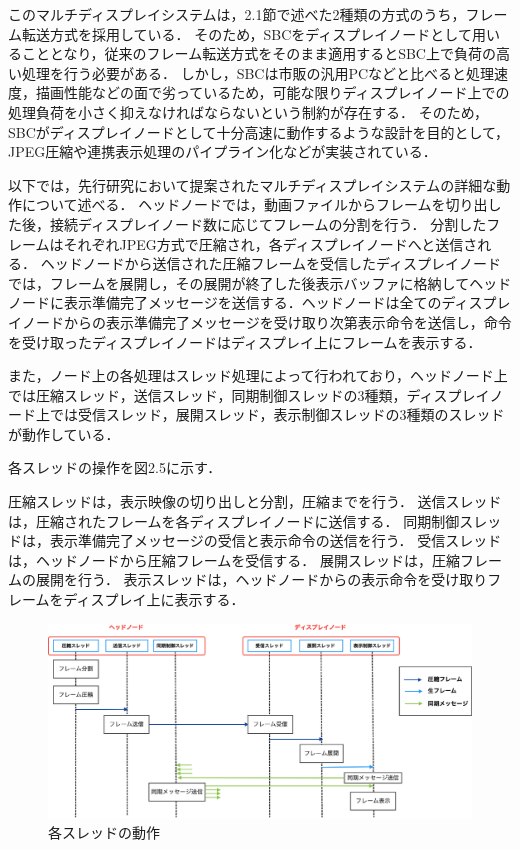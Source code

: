 このマルチディスプレイシステムは，2.1節で述べた2種類の方式のうち，フレーム転送方式を採用している．
そのため，SBCをディスプレイノードとして用いることとなり，従来のフレーム転送方式をそのまま適用するとSBC上で負荷の高い処理を行う必要がある．
しかし，SBCは市販の汎用PCなどと比べると処理速度，描画性能などの面で劣っているため，可能な限りディスプレイノード上での処理負荷を小さく抑えなければならないという制約が存在する．
そのため，SBCがディスプレイノードとして十分高速に動作するような設計を目的として，JPEG圧縮や連携表示処理のパイプライン化などが実装されている．

以下では，先行研究において提案されたマルチディスプレイシステムの詳細な動作について述べる．
ヘッドノードでは，動画ファイルからフレームを切り出した後，接続ディスプレイノード数に応じてフレームの分割を行う．
分割したフレームはそれぞれJPEG方式で圧縮され，各ディスプレイノードへと送信される．
ヘッドノードから送信された圧縮フレームを受信したディスプレイノードでは，フレームを展開し，その展開が終了した後表示バッファに格納してヘッドノードに表示準備完了メッセージを送信する．ヘッドノードは全てのディスプレイノードからの表示準備完了メッセージを受け取り次第表示命令を送信し，命令を受け取ったディスプレイノードはディスプレイ上にフレームを表示する．

また，ノード上の各処理はスレッド処理によって行われており，ヘッドノード上では圧縮スレッド，送信スレッド，同期制御スレッドの3種類，ディスプレイノード上では受信スレッド，展開スレッド，表示制御スレッドの3種類のスレッドが動作している．

各スレッドの操作を図2.5に示す．

圧縮スレッドは，表示映像の切り出しと分割，圧縮までを行う．
送信スレッドは，圧縮されたフレームを各ディスプレイノードに送信する．
同期制御スレッドは，表示準備完了メッセージの受信と表示命令の送信を行う．
受信スレッドは，ヘッドノードから圧縮フレームを受信する．
展開スレッドは，圧縮フレームの展開を行う．
表示スレッドは，ヘッドノードからの表示命令を受け取りフレームをディスプレイ上に表示する．

\begin{center}
  \begin{figure}[H]
      \hspace*{\fill}
      \includegraphics[width=1.1\linewidth]{./fig/chap2/frow_system.eps}
      \hspace*{\fill}
      \caption{各スレッドの動作}
  \end{figure}
  \end{center}

